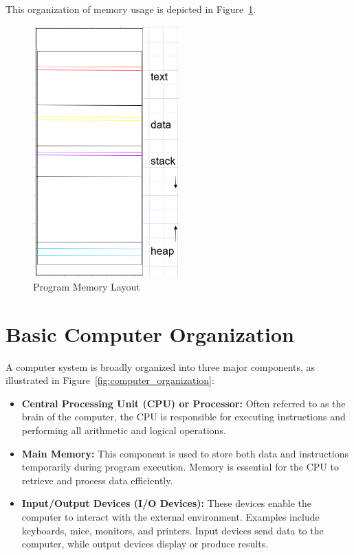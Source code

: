 \documentclass[12pt]{book}
\begin{document}
This organization of memory usage is depicted in Figure~\ref{fig:program_memory}.

\begin{figure}[H]
    \centering
    \includegraphics[width=0.5\textwidth]{images/program_memory.png}
    \caption{Program Memory Layout}
    \label{fig:program_memory}
\end{figure}


\section{Basic Computer Organization}

A computer system is broadly organized into three major components, as illustrated in Figure~\ref{fig:computer_organization}:

\begin{itemize}
    \item \textbf{Central Processing Unit (CPU) or Processor:} Often referred to as the brain of the computer, the CPU is responsible for executing instructions and performing all arithmetic and logical operations.
    
    \item \textbf{Main Memory:} This component is used to store both data and instructions temporarily during program execution. Memory is essential for the CPU to retrieve and process data efficiently.
    
    \item \textbf{Input/Output Devices (I/O Devices):} These devices enable the computer to interact with the external environment. Examples include keyboards, mice, monitors, and printers. Input devices send data to the computer, while output devices display or produce results.
\end{itemize}
\end{document}
